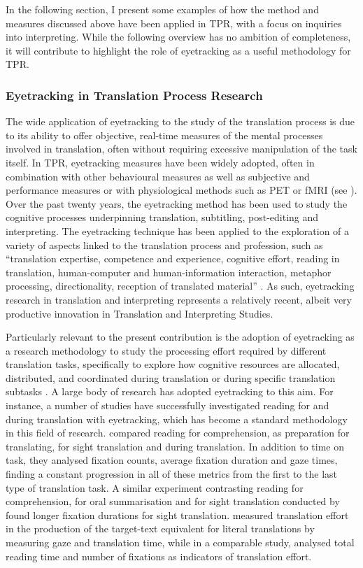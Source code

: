 In the following section, I present some examples of how the method and measures discussed above have been applied in TPR, with a focus on inquiries into interpreting. While the following overview has no ambition of completeness, it will contribute to highlight the role of eyetracking as a useful methodology for TPR.

\subsubsection{Eyetracking in Translation Process Research} \label{eyetracking_TPR}
The wide application of eyetracking to the study of the translation process is due to its ability to offer objective, real-time measures of the mental processes involved in translation, often without requiring excessive manipulation of the task itself. In TPR, eyetracking measures have been widely adopted, often in combination with other behavioural measures as well as subjective and performance measures or with physiological methods such as PET or fMRI (see ). Over the past twenty years, the eyetracking method has been used to study the cognitive processes underpinning translation, subtitling, post-editing and interpreting. The eyetracking technique has been applied to the exploration of a variety of aspects linked to the translation process and profession, such as ``translation expertise, competence and experience, cognitive effort, reading in translation, human-computer and human-information interaction, metaphor processing, directionality, reception of translated material'' \citep[251]{schwieter_eye_2017}. As such, eyetracking research in translation and interpreting represents a relatively recent, albeit very productive innovation in Translation and Interpreting Studies.

Particularly relevant to the present contribution is the adoption of eyetracking as a research methodology to study the processing effort required by different translation tasks, specifically to explore how cognitive resources are allocated, distributed, and coordinated during translation or during specific translation subtasks \citep[254]{schwieter_eye_2017}. A large body of research has adopted eyetracking to this aim. For instance, a number of studies have successfully investigated reading for and during translation with eyetracking, which has become a standard methodology in this field of research. \citet{jakobsen_eye_2008} compared reading for comprehension, as preparation for translating, for sight translation and during translation. In addition to time on task, they analysed fixation counts, average fixation duration and gaze times, finding a constant progression in all of these metrics from the first to the last type of translation task. A similar experiment contrasting reading for comprehension, for oral summarisation and for sight translation conducted by \citet{alves_towards_2011} found longer fixation durations for sight translation. \citet{schaeffer_measuring_2014} measured translation effort in the production of the target-text equivalent for literal translations by measuring gaze and translation time, while in a comparable study, \citet{dragsted_indicators_2012} analysed total reading time and number of fixations as indicators of translation effort.

